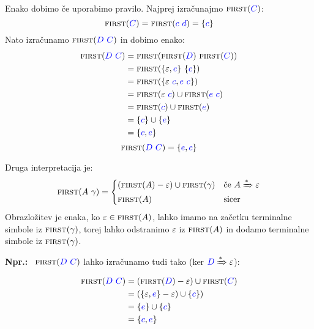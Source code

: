 \documentclass{article}
\newcommand{\Ex}{\textbf{Npr.:}\ }
\newcommand{\FIRST}{\textsc{first}}
\newcommand{\Symbol}[1]{\textcolor{blue}{#1}}
\newcommand{\Null}{\varepsilon}
\newcommand{\DeriveStar}{\xRightarrow{\ast}}
\newcommand{\Seq}{\ }
\begin{document}
  Enako dobimo če uporabimo pravilo.
  Najprej izračunajmo $\FIRST(\Symbol{C})$:
  \begin{equation*}
    \FIRST(\Symbol{C}) = \FIRST(\Symbol{c} \Seq \Symbol{d}) = \{\Symbol{c}\}
  \end{equation*}
  Nato izračunamo $\FIRST(\Symbol{D} \Seq \Symbol{C})$ in dobimo enako:
  \begin{equation*}
    \begin{aligned}
      \FIRST(\Symbol{D} \Seq \Symbol{C}) &= \FIRST(\FIRST(\Symbol{D}) \Seq \FIRST(\Symbol{C}))\\
                &= \FIRST(\{\Null, \Symbol{e}\} \Seq \{\Symbol{c}\})\\
                &= \FIRST(\{\Null \Seq \Symbol{c}, \Symbol{e} \Seq \Symbol{c}\})\\
                &= \FIRST(\Null \Seq \Symbol{c}) \cup \FIRST(\Symbol{e} \Seq \Symbol{c})\\
                &= \FIRST(\Symbol{c}) \cup \FIRST(\Symbol{e})\\
                &= \{\Symbol{c}\} \cup \{\Symbol{e}\}\\
                &= \{\Symbol{c}, \Symbol{e}\}
    \end{aligned}
  \end{equation*}
  \begin{equation*}
    \FIRST(\Symbol{D} \Seq \Symbol{C}) = \{\Symbol{e}, \Symbol{c}\}
  \end{equation*}

  Druga interpretacija je:
\begin{equation*}
  \FIRST(A \Seq \gamma) = \begin{cases}
    (\FIRST(A) - \Null) \cup \FIRST(\gamma) & \text{če } A \DeriveStar \Null \\
    \FIRST(A) & \text{sicer} \\
  \end{cases}
\end{equation*}
Obrazložitev je enaka, ko $\Null \in \FIRST(A)$, lahko imamo na začetku terminalne simbole iz $\FIRST(\gamma)$, torej lahko odstranimo $\Null$ iz $\FIRST(A)$ in dodamo terminalne simbole iz $\FIRST(\gamma)$.

\Ex
  $\FIRST(\Symbol{D} \Seq \Symbol{C})$ lahko izračunamo tudi tako (ker $\Symbol{D} \DeriveStar \Null$):
  \begin{equation*}
    \begin{aligned}
      \FIRST(\Symbol{D} \Seq \Symbol{C}) &= (\FIRST(\Symbol{D}) - \Null) \cup \FIRST(\Symbol{C})\\
                &= (\{\Null, \Symbol{e}\} - \Null) \cup \{\Symbol{c}\})\\
                &= \{\Symbol{e}\} \cup \{\Symbol{c}\}\\
                &= \{\Symbol{c}, \Symbol{e}\}
    \end{aligned}
  \end{equation*}
\end{document}
